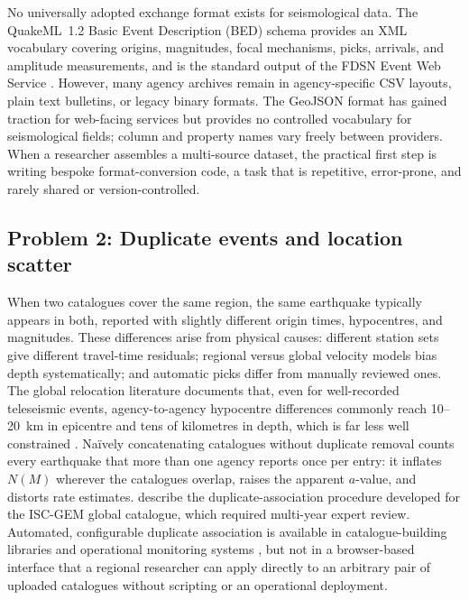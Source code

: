 \documentclass[12pt]{article}
\begin{document}
No universally adopted exchange format exists for seismological data.  The
QuakeML~1.2 Basic Event Description (BED) schema \citep{schorlemmer2011}
provides an XML vocabulary covering origins, magnitudes, focal
mechanisms, picks, arrivals, and amplitude measurements, and is the standard
output of the FDSN Event Web Service \citep{fdsn2013}.  However, many agency
archives remain in agency-specific CSV layouts, plain text bulletins, or
legacy binary formats.  The GeoJSON format \citep{geojson2016} has gained
traction for web-facing services but provides no controlled vocabulary for
seismological fields; column and property names vary freely between providers.
When a researcher assembles a multi-source dataset, the practical first step
is writing bespoke format-conversion code, a task that is repetitive,
error-prone, and rarely shared or version-controlled.

\subsection{Problem 2: Duplicate events and location scatter}

When two catalogues cover the same region, the same earthquake typically
appears in both, reported with slightly different origin times, hypocentres,
and magnitudes.  These differences arise from physical causes:
different station sets give different travel-time residuals; regional
versus global velocity models bias depth systematically; and automatic picks
differ from manually reviewed ones.  The global relocation literature
documents that, even for well-recorded teleseismic events, agency-to-agency
hypocentre differences commonly reach 10--20~km in epicentre and tens of
kilometres in depth, which is far less well constrained \citep{engdahl1998}.
Na{\"i}vely concatenating catalogues without duplicate removal counts every
earthquake that more than one agency reports once per entry: it inflates $N(M)$
wherever the catalogues overlap, raises the apparent $a$-value, and distorts rate
estimates.  \citet{storchak2013} describe the
duplicate-association procedure developed for the ISC-GEM global
catalogue, which required multi-year expert review.  Automated, configurable
duplicate association is available in catalogue-building libraries
\citep{oqmbtk} and operational monitoring systems \citep{seiscomp2008}, but not
in a browser-based interface that a regional researcher can apply directly to
an arbitrary pair of uploaded catalogues without scripting or an operational
deployment.
\end{document}
